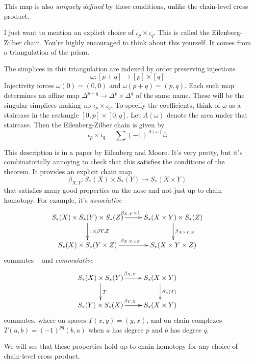 This map is also \emph{uniquely defined} by these conditions, unlike the chain-level cross product.

I just want to mention an explicit choice of $\iota_p\times\iota_q$. This is called the Eilenberg-Zilber chain. You're highly encouraged to think about this yourself. It comes from a triangulation of the prism. 

The simplices in this triangulation are indexed by order preserving injections
\[
\omega:[p+q]\to[p]\times[q]
\]
Injectivity forces $\omega(0)=(0,0)$ and $\omega(p+q)=(p,q)$. Each such map
determines an affine map $\Delta^{p+q}\to\Delta^p\times\Delta^q$ of the same name. These will be
the singular simplices making up $\iota_p\times\iota_q$. To specify the coefficients, think of $\omega$ as a staircase in the rectangle $[0,p]\times[0,q]$. 
Let $A(\omega)$ denote the area under that staircase. Then the Eilenberg-Zilber chain is given by 
\[
\iota_p\times\iota_q=\sum(-1)^{A(\omega)}\overline{\omega}
\]

This description is in a paper by Eilenberg and Moore. 
It's very pretty, but it's combinatorially annoying to check that this satisfies the conditions of the theorem. It provides an explicit chain map
\[
\beta_{X,Y}:S_*(X)\times S_*(Y)\to S_*(X\times Y)
\]
that satisfies many good properties on the nose and not just up to chain homotopy. For example, it's {\em associative} --
\[
\xymatrix{
S_*(X)\times S_*(Y)\times S_*(Z) \ar[r]^{\beta_{X,Y}\times 1} 
\ar[d]^{1\times\beta{Y,Z}} & 
S_*(X\times Y)\times S_*(Z) \ar[d]^{\beta_{X\times Y,Z}} \\
S_*(X)\times S_*(Y\times Z) \ar[r]^{\beta_{X,Y\times Z}} &
S_*(X\times Y\times Z)
}\]
commutes -- and {\em commutative} --
\[
\xymatrix{
S_*(X)\times S_*(Y) \ar[r]^{\beta_{X,Y}} \ar[d]^{T} & 
S_*(X\times Y) \ar[d]^{S_*(T)} \\
S_*(Y)\times S_*(X) \ar[r]^{\beta_{Y,X}} \ar[r] & S_*(X\times Y)
}\]
commutes, where on spaces $T(x,y)=(y,x)$, and on chain complexes
$T(a,b)=(-1)^{pq}(b,a)$ when $a$ has degree $p$ and $b$ has degree $q$. 

We will see that these properties hold up to chain homotopy for any 
choice of chain-level cross product.

